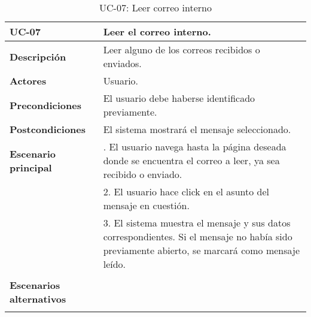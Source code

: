 \begin{table}[H]
  \begin{center}
    \begin{tabularx}{16.4cm}{|l|X|}
      \hline
      \textbf{UC-07} & \textbf{Leer el correo interno.}\\
      \hline
      \textbf{Descripción} & Leer alguno de los correos recibidos o enviados.\\
      \hline
      \textbf{Actores} & Usuario.\\
      \hline
      \textbf{Precondiciones} & El usuario debe haberse identificado previamente.\\
      \hline
      \textbf{Postcondiciones} & El sistema mostrará el mensaje seleccionado.\\
      \hline
      \textbf{Escenario principal} & \smallskip 1. El usuario navega hasta la página deseada donde se encuentra el correo a leer, ya sea recibido o enviado.\\
      & 2. El usuario hace click en el asunto del mensaje en cuestión.\\
      & 3. El sistema muestra el mensaje y sus datos correspondientes. Si el mensaje no había sido previamente abierto, se marcará como mensaje leído.\\
      & \\
      \hline
      \textbf{Escenarios alternativos} & \\
      & \\
      \hline
    \end{tabularx}
    \caption{UC-07: Leer correo interno}
  \end{center}
\end{table}


